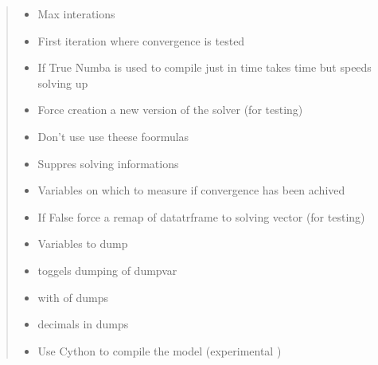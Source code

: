 \documentclass[letterpaper,10pt,english]{sphinxmanual}
\begin{document}
\begin{fulllineitems}
\begin{fulllineitems}
\begin{quote}
\begin{description}
\begin{itemize}
\item {} 
\sphinxAtStartPar
{} \textendash{} Max interations

\item {} 
\sphinxAtStartPar
{} \textendash{} First iteration where convergence is tested

\item {} 
\sphinxAtStartPar
{} \textendash{} If True Numba is used to compile just in time \sphinxhyphen{} takes time but speeds solving up

\item {} 
\sphinxAtStartPar
{} \textendash{} Force creation a new version of the solver (for testing)

\item {} 
\sphinxAtStartPar
{} \textendash{} Don’t use use theese foormulas

\item {} 
\sphinxAtStartPar
{} \textendash{} Suppres solving informations

\item {} 
\sphinxAtStartPar
{} \textendash{} Variables on which to measure if convergence has been achived

\item {} 
\sphinxAtStartPar
{} \textendash{} If False force a remap of datatrframe to solving vector (for testing)

\item {} 
\sphinxAtStartPar
{} \textendash{} Variables to dump

\item {} 
\sphinxAtStartPar
{} \textendash{} toggels dumping of dumpvar

\item {} 
\sphinxAtStartPar
{} \textendash{} with of dumps

\item {} 
\sphinxAtStartPar
{} \textendash{} decimals in dumps

\item {} 
\sphinxAtStartPar
{} \textendash{} Use Cython to compile the model (experimental )


\end{itemize}
\end{description}
\end{quote}
\end{fulllineitems}
\end{fulllineitems}
\end{document}
